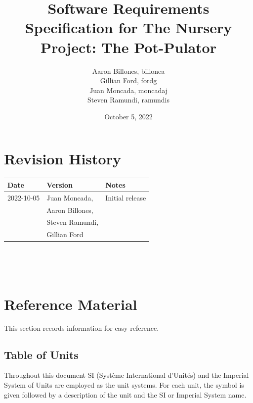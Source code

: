 \documentclass[12pt]{article}
\begin{document}
\title{Software Requirements Specification for The Nursery Project: The Pot-Pulator} 
\author{Aaron Billones, billonea\\Gillian Ford, fordg\\Juan Moncada, moncadaj\\Steven Ramundi, ramundis}
\date{October 5, 2022}
	
\maketitle

\section*{Revision History}

\begin{tabularx}{\textwidth}{p{3cm}p{4cm}X}
\toprule {\bf Date} & {\bf Version} & {\bf Notes}\\
\midrule
2022-10-05 & Juan Moncada,& Initial release\\&Aaron Billones,\\&Steven Ramundi,\\&Gillian Ford \\

\bottomrule
\end{tabularx}

~\newpage


\tableofcontents

~\newpage

\section{Reference Material}

This section records information for easy reference.

\subsection{Table of Units}

Throughout this document SI (Syst\`{e}me International d'Unit\'{e}s) and the Imperial System of Units are employed
as the unit systems. For each unit, the symbol is given followed by a
description of the unit and the SI or Imperial System name.
~\newline
\end{document}
